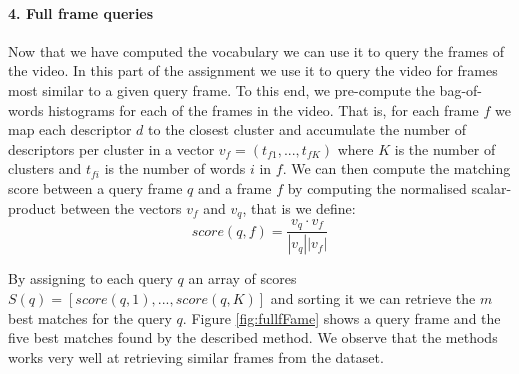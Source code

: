 \documentclass{paper}
\begin{document}
\paragraph{4. Full frame queries}
Now that we have computed the vocabulary we can use it to query the frames of the video. In this part of the assignment we use it to query the video for frames most similar to a given query frame. To this end, we pre-compute the  bag-of-words histograms for each of the frames in the video. That is, for each frame $f$ we map each descriptor $d$ to the closest cluster and accumulate the number of descriptors per cluster in a vector $v_f=(t_{f1},...,t_{fK})$ where $K$ is the number of clusters and $t_{fi}$ is the number of words $i$ in $f$. We can then compute the matching score between a query frame $q$ and a frame $f$ by computing the normalised scalar-product between the vectors $v_f$ and $v_q$, that is we define:
\begin{equation}
score(q,f)= \frac{v_q\cdot v_f}{|v_q| | v_f|}
\end{equation}

By assigning to each query $q$ an array of scores $S(q)=[score(q,1),...,score(q,K)]$ and sorting it we can retrieve the $m$ best matches for the query $q$. Figure \ref{fig:fullfFame} shows a query frame and the five best matches found by the described method. We observe that the methods works very well at retrieving similar frames from the dataset.
\end{document}

